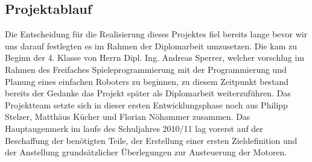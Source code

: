 \subsection{Projektablauf}
Die Entscheidung für die Realisierung dieses Projektes fiel bereits lange bevor wir uns darauf festlegten es im Rahmen der Diplomarbeit umzusetzen. Die kam zu Beginn der 4. Klasse von Herrn Dipl. Ing. Andreas Sperrer, welcher vorschlug im Rahmen des Freifaches Spieleprogrammierung mit der Programmierung und Planung eines einfachen Roboters zu beginnen, zu diesem Zeitpunkt bestand bereits der Gedanke das Projekt später als Diplomarbeit weiterzuführen. Das Projektteam setzte sich in dieser ersten Entwicklungsphase noch aus Philipp Stelzer, Matthäus Kücher und Florian Nöhammer zusammen. Das Hauptaugenmerk im laufe des Schuljahres 2010/11 lag vorerst auf der Beschaffung der benötigten Teile, der Erstellung einer ersten Zieldefinition und der Anstellung grundsätzlicher Überlegungen zur Ansteuerung der Motoren.\\

